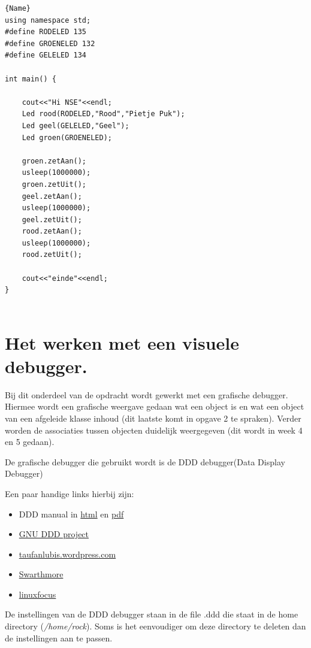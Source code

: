 \begin{enumerate}
\begin{itemize}
\begin{lstlisting}[caption=Hoofdprogramma om de LED uit te testen ,frame=tlrb, label={lst:hfdprg2}]{Name}
using namespace std;
#define RODELED 135
#define GROENELED 132
#define GELELED 134

int main() {
	
	cout<<"Hi NSE"<<endl;
	Led rood(RODELED,"Rood","Pietje Puk");
	Led geel(GELELED,"Geel");
	Led groen(GROENELED);
	
	groen.zetAan();
	usleep(1000000);
	groen.zetUit();
	geel.zetAan();
	usleep(1000000);
	geel.zetUit();
	rood.zetAan();
	usleep(1000000);  
	rood.zetUit();
	
	cout<<"einde"<<endl;
}


\end{lstlisting}	
\end{itemize}


    \end{enumerate}


\section{Het werken met een visuele debugger.}
 
Bij dit onderdeel van de opdracht wordt gewerkt met een grafische debugger. Hiermee wordt een grafische weergave gedaan wat een object is en wat een object van een afgeleide klasse inhoud (dit laatste komt in opgave 2 te spraken). Verder worden de associaties tussen objecten duidelijk weergegeven (dit wordt in week 4 en 5 gedaan).

De grafische debugger die gebruikt wordt is de DDD debugger(Data Display Debugger) 


Een paar handige links hierbij zijn:

\begin{itemize}
	\item DDD manual in \href{https://www.gnu.org/software/ddd/manual/html_mono/ddd.html}{html} en \href{https://www.gnu.org/software/ddd/manual/pdf/ddd.pdf}{pdf}
	\item \href{https://www.gnu.org/software/ddd/}{GNU DDD project}
	\item \href{href="https://taufanlubis.wordpress.com/2019/02/19/gnu-debugger-front-end-graphical-user-interface-with-ddd}{taufanlubis.wordpress.com}
	\item  \href{https://www.cs.swarthmore.edu/~newhall/unixhelp/howto_gdb.php}{Swarthmore}
	\item  \href{http://www.linuxfocus.org/English/January1998/article20.html}{linuxfocus}
\end{itemize}

De instellingen van de DDD debugger staan in de file .ddd die staat in de home directory (\textit{/home/rock}). Soms is het eenvoudiger om deze directory te deleten dan de instellingen aan te passen.

